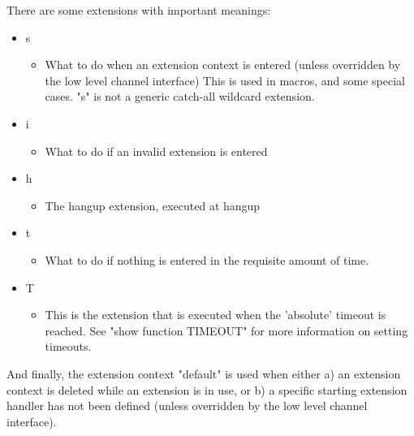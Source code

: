 There are some extensions with important meanings:

\begin{itemize}
  \item s	
  \begin{itemize}
    \item What to do when an extension context is entered (unless
          overridden by the low level channel interface)
          This is used in macros, and some special cases. 
          "s" is not a generic catch-all wildcard extension.
  \end{itemize}
  \item i
  \begin{itemize}
    \item What to do if an invalid extension is entered
  \end{itemize}
  \item h
  \begin{itemize}
    \item The hangup extension, executed at hangup
  \end{itemize}
  \item t
  \begin{itemize}
    \item What to do if nothing is entered in the requisite amount
          of time.
  \end{itemize}
  \item T
  \begin{itemize}
    \item This is the extension that is executed when the 'absolute'
          timeout is reached.  See "show function TIMEOUT" for more
          information on setting timeouts.	
  \end{itemize}
\end{itemize}

And finally, the extension context "default" is used when either a) an 
extension context is deleted while an extension is in use, or b) a specific
starting extension handler has not been defined (unless overridden by the
low level channel interface).
